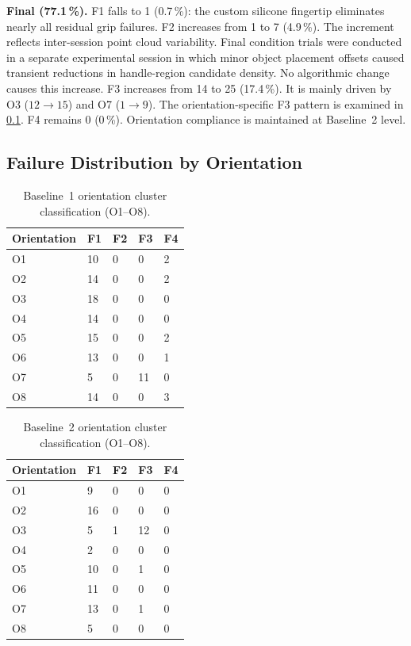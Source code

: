 \documentclass[oneside,studentpaper]{wbk}
\begin{document}
\textbf{Final (77.1\,\%).} F1 falls to 1 (0.7\,\%): the custom silicone fingertip eliminates nearly all residual grip failures. F2 increases from 1 to 7 (4.9\,\%). The increment reflects inter-session point cloud variability. Final condition trials were conducted in a separate experimental session in which minor object placement offsets caused transient reductions in handle-region candidate density. No algorithmic change causes this increase. F3 increases from 14 to 25 (17.4\,\%). It is mainly driven by O3 ($12\to15$) and O7 ($1\to9$). The orientation-specific F3 pattern is examined in \cref{sec:failure-distribution-by-orientation}. F4 remains 0 (0\,\%). Orientation compliance is maintained at Baseline~2 level.

\subsection{Failure Distribution by Orientation}
\label{sec:failure-distribution-by-orientation}

\begin{table}[htbp]
  \centering
  \caption{Baseline~1 orientation cluster classification (O1--O8).}
  \label{tab:baseline1-orientation-clusters}
  \begin{tabular}{lllll}
    \toprule
    Orientation & F1 & F2 & F3 & F4 \\
    \midrule
    O1 & 10 & 0 &  0 & 2 \\
    O2 & 14 & 0 &  0 & 2 \\
    O3 & 18 & 0 &  0 & 0 \\
    O4 & 14 & 0 &  0 & 0 \\
    O5 & 15 & 0 &  0 & 2 \\
    O6 & 13 & 0 &  0 & 1 \\
    O7 &  5 & 0 & 11 & 0 \\
    O8 & 14 & 0 &  0 & 3 \\
    \bottomrule
  \end{tabular}
\end{table}

\begin{table}[htbp]
  \centering
  \caption{Baseline~2 orientation cluster classification (O1--O8).}
  \label{tab:baseline2-orientation-clusters}
  \begin{tabular}{lllll}
    \toprule
    Orientation & F1 & F2 & F3 & F4 \\
    \midrule
    O1 &  9 & 0 &  0 & 0 \\
    O2 & 16 & 0 &  0 & 0 \\
    O3 &  5 & 1 & 12 & 0 \\
    O4 &  2 & 0 &  0 & 0 \\
    O5 & 10 & 0 &  1 & 0 \\
    O6 & 11 & 0 &  0 & 0 \\
    O7 & 13 & 0 &  1 & 0 \\
    O8 &  5 & 0 &  0 & 0 \\
    \bottomrule
  \end{tabular}
\end{table}
\end{document}

